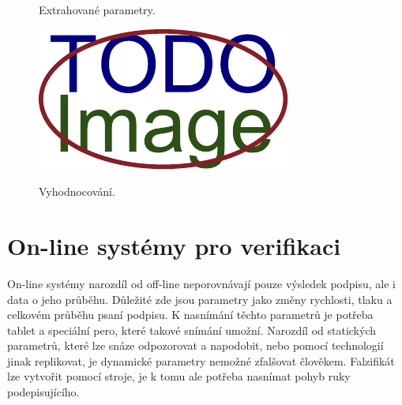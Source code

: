\begin{figure}[h]
\begin{minipage}{0.3\textwidth}
    \caption{Extrahované parametry.}
  \end{minipage}\hfill
  \begin{minipage}{0.3\textwidth}\label{fig:third-image}
    \centering
    \includegraphics[width=\textwidth]{obrazky-figures/placeholder.pdf}
    \caption{Vyhodnocování.}
  \end{minipage}
\end{figure}

\section{On-line systémy pro verifikaci} 
On-line systémy narozdíl od off-line neporovnávají pouze výsledek podpisu, ale i data o jeho průběhu. %
Důležité zde jsou parametry jako změny rychlosti, tlaku a celkovém průběhu psaní podpisu.             %
K nasnímání těchto parametrů je potřeba tablet a speciální pero, které takové snímání umožní.         %
Narozdíl od statických parametrů, které lze snáze odpozorovat a napodobit,                            %
nebo pomocí technologií jinak replikovat, je dynamické parametry nemožné zfalšovat člověkem.          %
Falzifikát lze vytvořit pomocí stroje, je k tomu ale potřeba nasnímat pohyb ruky podepisujícího.      %

